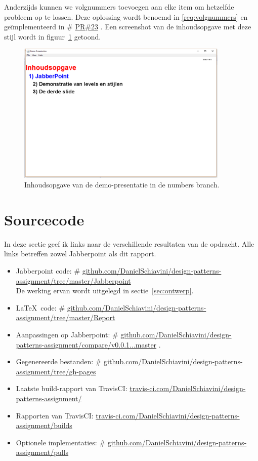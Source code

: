 \documentclass[a4paper]{article}
\makeatletter
\newcommand*{\repo}{\begingroup\@makeother\#\@repo}
\newcommand*{\@repo}[2]{%
  \href{https://github.com/DanielSchiavini/design-patterns-assignment/#1}{#2}%
  \endgroup}
\newcommand{\PR}[1]{\repo{pull/#1}{PR\##1}}
\newcommand{\repolink}[1]{\repo{#1}{github.com\-/Daniel\-Schiavini\-/de\-sign-\-pat\-terns-\-as\-sign\-ment\-/#1}}
\newcommand{\cilink}[1]{\href{https://travis-ci.com/DanielSchiavini/design-patterns-assignment/#1}{travis-ci.com/DanielSchiavini/design-patterns-assignment/#1}}
\newcommand{\reqref}[1]{\ref{req:#1}}
\makeatother
\begin{document}
    Anderzijds kunnen we volgnummers toevoegen aan elke item om hetzelfde probleem op te lossen.
    Deze oplossing wordt benoemd in \reqref{volgnummers} en ge\-ïmple\-men\-teerd in \PR{23}.
    Een screenshot van de inhoudsopgave met deze stijl wordt in figuur~\ref{fig:numbers} getoond.
    \begin{figure}[!htb]
     \caption{
        Inhoudsopgave van de demo-presentatie in de numbers branch.\label{fig:numbers}
     }
     \centering \includegraphics[width=0.9\textwidth]{Screenshots/numbers.png}
    \end{figure}
    
    
\section{Sourcecode}
In deze sectie geef ik links naar de verschillende resultaten van de opdracht.
Alle links betreffen zowel Jabberpoint als dit rapport.
\begin{itemize}
    \item Jabberpoint code:
        \repolink{tree/master/Jabberpoint}\\
        De werking ervan wordt uitgelegd in sectie~\ref{sec:ontwerp}.
    \item \LaTeX ~code:
        \repo{tree/master/Report}{github.com/DanielSchiavini/design-patterns-assignment/tree\-/master\-/Report}
    \item Aanpassingen op Jabberpoint:
        \repolink{compare/v0.0.1...master}.
    \item Gegenereerde bestanden:
        \repolink{tree/gh-pages}
    \item Laatste build-rapport van TravisCI:
        \cilink{}
    \item Rapporten van TravisCI:
        \cilink{builds}
    \item Optionele implementaties:
        \repolink{pulls}
\end{itemize}
\end{document}

